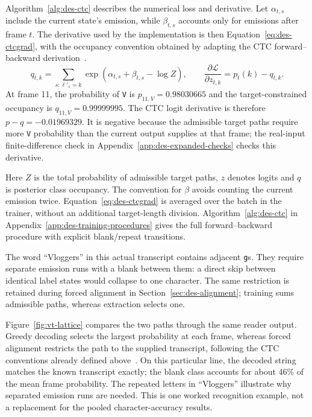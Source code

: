 Algorithm~\ref{alg:des-ctc} describes the numerical loss and derivative. Let $\alpha_{t,s}$ include the current state's emission, while $\beta_{t,s}$ accounts only for emissions after frame $t$. The derivative used by the implementation is then Equation~\ref{eq:des-ctcgrad}, with the occupancy convention obtained by adapting the CTC forward--backward derivation~\cite[pp.~5--6]{graves2006}.
\begin{equation}
q_{t,k}=\sum_{s:\ell'_s=k}\exp(\alpha_{t,s}+\beta_{t,s}-\log Z),
\qquad \frac{\partial\mathcal L}{\partial z_{t,k}}=p_t(k)-q_{t,k}.
\label{eq:des-ctcgrad}
\end{equation}
At frame 11, the probability of \texttt{V} is $p_{11,V}=0.98030665$ and the target-constrained occupancy is $q_{11,V}=0.99999995$. The CTC logit derivative is therefore $p-q=-0.01969329$. It is negative because the admissible target paths require more \texttt{V} probability than the current output supplies at that frame; the real-input finite-difference check in Appendix~\ref{app:des-expanded-checks} checks this derivative.

Here $Z$ is the total probability of admissible target paths, $z$ denotes logits and $q$ is posterior class occupancy. The convention for $\beta$ avoids counting the current emission twice. Equation~\ref{eq:des-ctcgrad} is averaged over the batch in the trainer, without an additional target-length division.
Algorithm~\ref{alg:des-ctc} in Appendix~\ref{app:des-training-procedures} gives the full forward--backward procedure with explicit blank/repeat transitions.

The word ``Vloggers'' in this actual transcript contains adjacent \texttt{g}s. They require separate emission runs with a blank between them: a direct skip between identical label states would collapse to one character. The same restriction is retained during forced alignment in Section~\ref{sec:des-alignment}; training sums admissible paths, whereas extraction selects one.

Figure~\ref{fig:vt-lattice} compares the two paths through the same reader output. Greedy decoding selects the largest probability at each frame, whereas forced alignment restricts the path to the supplied transcript, following the CTC conventions already defined above~\cite[pp.~2--4]{graves2006}. On this particular line, the decoded string matches the known transcript exactly; the blank class accounts for about 46\% of the mean frame probability. The repeated letters in ``Vloggers'' illustrate why separated emission runs are needed. This is one worked recognition example, not a replacement for the pooled character-accuracy results.

